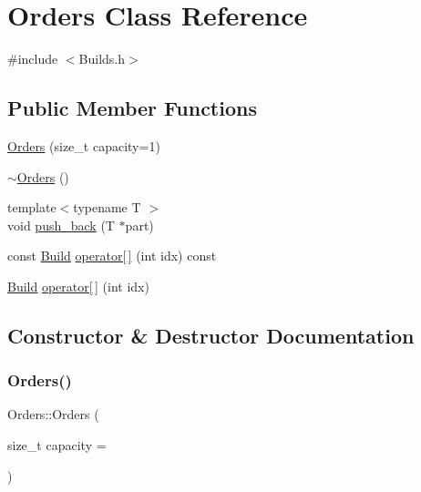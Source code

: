 \hypertarget{class_orders}{}\section{Orders Class Reference}
\label{class_orders}


{\ttfamily \#include $<$Builds.\+h$>$}

\subsection*{Public Member Functions}
\begin{DoxyCompactItemize}
\item 
\mbox{\hyperlink{class_orders_aa52a641a269671bbf68637e0771e8b5d}{Orders}} (size\+\_\+t capacity=1)
\item 
\mbox{\hyperlink{class_orders_a12bcbd0cd430b51f65f651fddad3f662}{$\sim$\+Orders}} ()
\item 
{\footnotesize template$<$typename T $>$ }\\void \mbox{\hyperlink{class_orders_a678969b0e57fd41f4ab0cc949d4500f6}{push\+\_\+back}} (T $\ast$part)
\item 
const \mbox{\hyperlink{class_build}{Build}} \mbox{\hyperlink{class_orders_a9574f4521c39b8a8d7cdfd1f28b07ffb}{operator\mbox{[}$\,$\mbox{]}}} (int idx) const
\item 
\mbox{\hyperlink{class_build}{Build}} \mbox{\hyperlink{class_orders_abae5fb4a0e7dfa2c222215850531d695}{operator\mbox{[}$\,$\mbox{]}}} (int idx)
\end{DoxyCompactItemize}


\subsection{Constructor \& Destructor Documentation}
\mbox{\label{class_orders_aa52a641a269671bbf68637e0771e8b5d}} 
\subsubsection{\texorpdfstring{Orders()}{Orders()}}
{\footnotesize\ttfamily Orders\+::\+Orders (\begin{DoxyParamCaption}\item[{size\+\_\+t}]{capacity = {} }\end{DoxyParamCaption})\hspace{0.3cm}{\ttfamily [inline]}}

